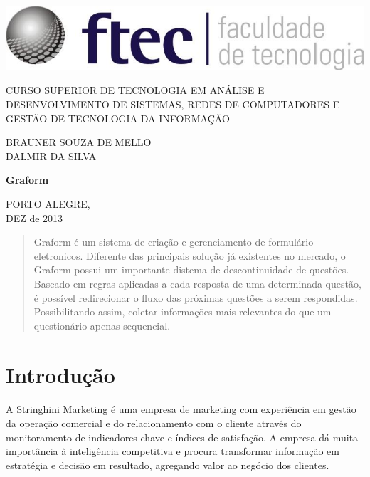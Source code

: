\documentclass[11pt]{article}
\begin{document}
  \begin{titlepage}
  
    \centering
    \includegraphics[width=.5\textwidth]{logo.jpg}

    \large{CURSO SUPERIOR DE TECNOLOGIA EM ANÁLISE E DESENVOLVIMENTO DE SISTEMAS, REDES DE COMPUTADORES E GESTÃO DE TECNOLOGIA DA INFORMAÇÃO}


    \large{BRAUNER SOUZA DE MELLO\\DALMIR DA SILVA}

    \large{\textbf{Graform}}

    \large{PORTO ALEGRE, \\DEZ de 2013}
    
  \end{titlepage}

  \newpage
  \thispagestyle{empty}
  \mbox{}
  \newpage

  \begin{abstract}
    Graform é um sistema de criação e gerenciamento de formulário eletronicos. Diferente das principais solução já existentes no mercado, o Graform possui um
    importante distema de descontinuidade de questões. Baseado em regras aplicadas a cada resposta de uma determinada questão, é possível redirecionar o fluxo das próximas
    questões a serem respondidas. Possibilitando assim, coletar informações mais relevantes do que um questionário apenas sequencial.
  \end{abstract}

  \newpage

  \section{Introdução}

    \paragraph{} \hspace{10pt}
    
    A Stringhini Marketing é uma empresa de marketing com experiência em gestão da operação comercial e do relacionamento com o cliente através do monitoramento de indicadores chave e índices de satisfação. A empresa dá muita importância à inteligência competitiva e procura transformar informação em estratégia e decisão em resultado, agregando valor ao negócio dos clientes.
\end{document}
